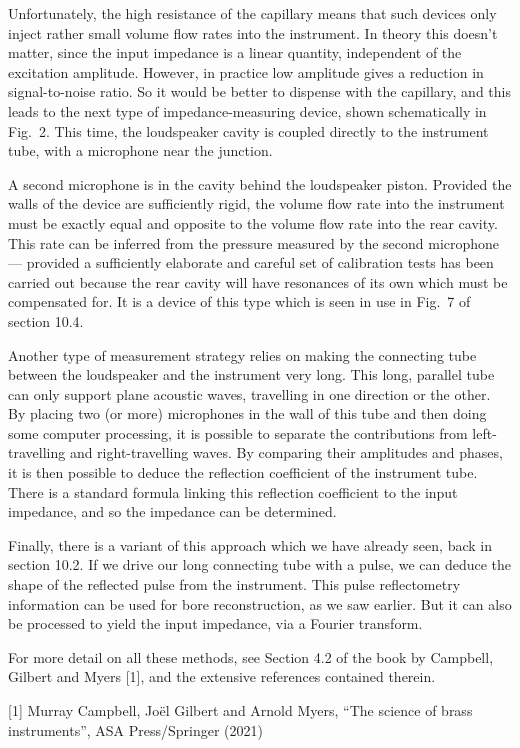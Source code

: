   Unfortunately, the high resistance of the capillary means that such devices 
  only inject rather small volume flow rates into the instrument. In theory 
  this doesn’t matter, since the input impedance is a linear quantity, 
  independent of the excitation amplitude. However, in practice low amplitude 
  gives a reduction in signal-to-noise ratio. So it would be better to dispense 
  with the capillary, and this leads to the next type of impedance-measuring 
  device, shown schematically in Fig.\ 2. This time, the loudspeaker cavity is 
  coupled directly to the instrument tube, with a microphone near the junction. 


  A second microphone is in the cavity behind the loudspeaker piston. Provided 
  the walls of the device are sufficiently rigid, the volume flow rate into the 
  instrument must be exactly equal and opposite to the volume flow rate into 
  the rear cavity. This rate can be inferred from the pressure measured by the 
  second microphone — provided a sufficiently elaborate and careful set of 
  calibration tests has been carried out because the rear cavity will have 
  resonances of its own which must be compensated for. It is a device of this 
  type which is seen in use in Fig.\ 7 of section 10.4. 

  Another type of measurement strategy relies on making the connecting tube 
  between the loudspeaker and the instrument very long. This long, parallel 
  tube can only support plane acoustic waves, travelling in one direction or 
  the other. By placing two (or more) microphones in the wall of this tube and 
  then doing some computer processing, it is possible to separate the 
  contributions from left-travelling and right-travelling waves. By comparing 
  their amplitudes and phases, it is then possible to deduce the reflection 
  coefficient of the instrument tube. There is a standard formula linking this 
  reflection coefficient to the input impedance, and so the impedance can be 
  determined. 

  Finally, there is a variant of this approach which we have already seen, back 
  in section 10.2. If we drive our long connecting tube with a pulse, we can 
  deduce the shape of the reflected pulse from the instrument. This pulse 
  reflectometry information can be used for bore reconstruction, as we saw 
  earlier. But it can also be processed to yield the input impedance, via a 
  Fourier transform. 

  For more detail on all these methods, see Section 4.2 of the book by 
  Campbell, Gilbert and Myers [1], and the extensive references contained 
  therein. 

  \sectionreferences{}[1] Murray Campbell, Joël Gilbert and Arnold Myers, “The 
  science of brass instruments”, ASA Press/Springer (2021) 
